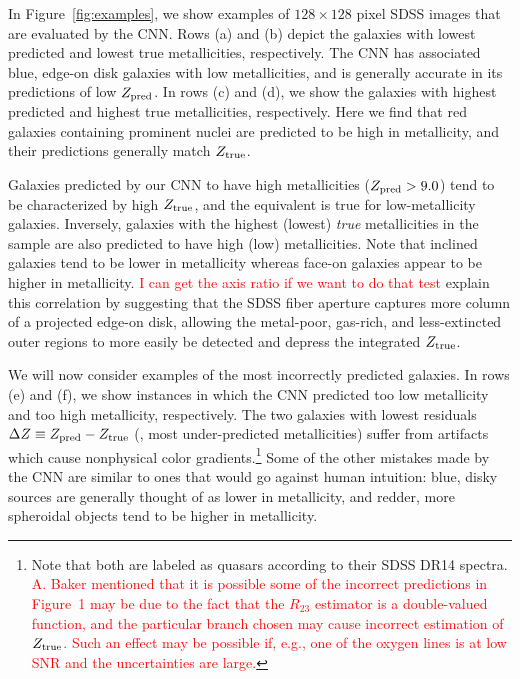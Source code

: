 \documentclass[fleqn,usenatbib]{mnras}
\newcommand{\editorial}[1]{\textcolor{red}{#1}}
\begin{document}
In Figure~\ref{fig:examples}, we show examples of $128 \times 128$ pixel \sdssi\sdssr\sdssg{} SDSS images that are evaluated by the CNN. Rows (a) and (b) depict the galaxies with lowest predicted and lowest true metallicities, respectively. The CNN has associated blue, edge-on disk galaxies with low metallicities, and is generally accurate in its predictions of low $Z_{\rm pred}$. In rows (c) and (d), we show the galaxies with highest predicted and highest true metallicities, respectively. Here we find that red galaxies containing prominent nuclei are predicted to be high in metallicity, and their predictions generally match $Z_{\rm true}$.

Galaxies predicted by our CNN to have high metallicities ($Z_{\rm pred} > 9.0$) tend to be characterized by high $Z_{\rm true}$, and the equivalent is true for low-metallicity galaxies. Inversely, galaxies with the highest (lowest) \textit{true} metallicities in the sample are also predicted to have high (low) metallicities. Note that inclined galaxies tend to be lower in metallicity whereas face-on galaxies appear to be higher in metallicity. \editorial{I can get the axis ratio if we want to do that test} \cite{Tremonti2004} explain this correlation by suggesting that the SDSS fiber aperture captures more column of a projected edge-on disk, allowing the metal-poor, gas-rich, and less-extincted outer regions to more easily be detected and depress the integrated $Z_{\rm true}$.

We will now consider examples of the most incorrectly predicted galaxies. In rows (e) and (f), we show instances in which the CNN predicted too low metallicity and too high metallicity, respectively. The two galaxies with lowest residuals $\Delta Z \equiv Z_{\rm pred} - Z_{\rm true}$ (\ie, most under-predicted metallicities) suffer from artifacts which cause nonphysical color gradients.\footnote{Note that both are labeled as quasars according to their SDSS DR14 spectra. \editorial{A. Baker mentioned that it is possible some of the incorrect predictions in Figure~1 may be due to the fact that the $R_{23}$ estimator is a double-valued function, and the particular branch chosen may cause incorrect estimation of $Z_{\rm true}$. Such an effect may be possible if, e.g., one of the oxygen lines is at low SNR and the uncertainties are large.}} Some of the other mistakes made by the CNN are similar to ones that would go against human intuition: blue, disky sources are generally thought of as lower in metallicity, and redder, more spheroidal objects tend to be higher in metallicity.
\end{document}
